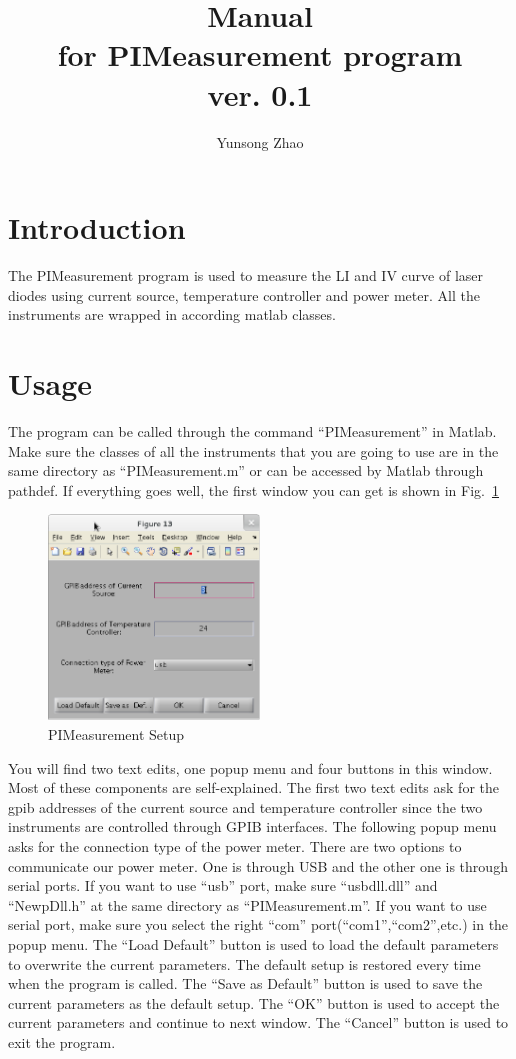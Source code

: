 \documentclass[a4paper,12pt]{article}
\title{Manual\\ \large for PIMeasurement program\\ ver. 0.1}
\author{Yunsong Zhao}
\date{}
\begin{document}
\maketitle
\section{Introduction}
The PIMeasurement program is used to measure the LI and IV curve of laser diodes
using current source, temperature controller and power meter. All the
instruments are wrapped in according matlab classes. 
\section{Usage}
The program can be called through the command ``PIMeasurement'' in Matlab. Make
sure the classes of all the instruments that you are going to use are in the
same directory as ``PIMeasurement.m'' or can be accessed by Matlab through
pathdef. If everything goes well, the first window you can get is shown in
Fig.~\ref{fig:setup}
\begin{figure}[htbp]
	\centering
	\includegraphics[width=0.5\textwidth]{./figs/setup.eps}
	\caption{PIMeasurement Setup}
	\label{fig:setup}
\end{figure}

You will find two text edits, one popup menu and four buttons in this window.
Most of these components are self-explained. The first two text edits ask for
the gpib addresses of the current source and temperature controller since the
two instruments are controlled through GPIB interfaces. The following popup menu
asks for the connection type of the power meter. There are two options to
communicate our power meter. One is through USB and the other one is through
serial ports. If you want to use ``usb'' port, make sure ``usbdll.dll'' and
``NewpDll.h'' at the same directory as ``PIMeasurement.m''. If you want to use
serial port, make sure you select the right ``com'' port(``com1'',``com2'',etc.) in
the popup menu. The ``Load Default'' button is used to load the default parameters
to overwrite the current parameters. The default setup is restored every time
when the program is called. The ``Save as Default'' button is used to save the
current parameters as the default setup. The ``OK'' button is used to accept the
current parameters and continue to next window. The ``Cancel'' button is used to
exit the program.
\end{document}
